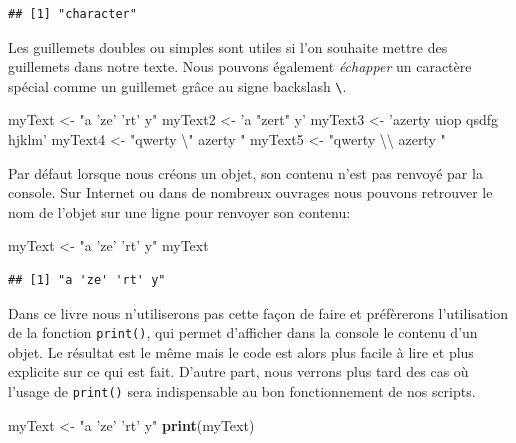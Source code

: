 \documentclass[twoside,symmetric]{book}
\newenvironment{Shaded}{}{}
\newcommand{\CharTok}[1]{#1}
\newcommand{\KeywordTok}[1]{\textbf{#1}}
\newcommand{\NormalTok}[1]{#1}
\newcommand{\StringTok}[1]{#1}
\begin{document}
\begin{verbatim}
## [1] "character"
\end{verbatim}

Les guillemets doubles ou simples sont utiles si l'on souhaite mettre des guillemets dans notre texte. Nous pouvons également \emph{échapper} un caractère spécial comme un guillemet grâce au signe backslash \texttt{\textbackslash{}}.

\begin{Shaded}
\begin{Highlighting}[]
\NormalTok{myText <-}\StringTok{ "a 'ze' 'rt' y"}
\NormalTok{myText2 <-}\StringTok{ 'a "zert" y'}
\NormalTok{myText3 <-}\StringTok{ 'azerty uiop qsdfg hjklm'}
\NormalTok{myText4 <-}\StringTok{ "qwerty }\CharTok{\textbackslash{}"}\StringTok{ azerty "}
\NormalTok{myText5 <-}\StringTok{ "qwerty }\CharTok{\textbackslash{}\textbackslash{}}\StringTok{ azerty "}
\end{Highlighting}
\end{Shaded}

Par défaut lorsque nous créons un objet, son contenu n'est pas renvoyé par la console. Sur Internet ou dans de nombreux ouvrages nous pouvons retrouver le nom de l'objet sur une ligne pour renvoyer son contenu:

\begin{Shaded}
\begin{Highlighting}[]
\NormalTok{myText <-}\StringTok{ "a 'ze' 'rt' y"}
\NormalTok{myText}
\end{Highlighting}
\end{Shaded}

\begin{verbatim}
## [1] "a 'ze' 'rt' y"
\end{verbatim}

Dans ce livre nous n'utiliserons pas cette façon de faire et préfèrerons l'utilisation de la fonction \texttt{print()}, qui permet d'afficher dans la console le contenu d'un objet. Le résultat est le même mais le code est alors plus facile à lire et plus explicite sur ce qui est fait. D'autre part, nous verrons plus tard des cas où l'usage de \texttt{print()} sera indispensable au bon fonctionnement de nos scripts.

\begin{Shaded}
\begin{Highlighting}[]
\NormalTok{myText <-}\StringTok{ "a 'ze' 'rt' y"}
\KeywordTok{print}\NormalTok{(myText)}
\end{Highlighting}
\end{Shaded}
\end{document}
